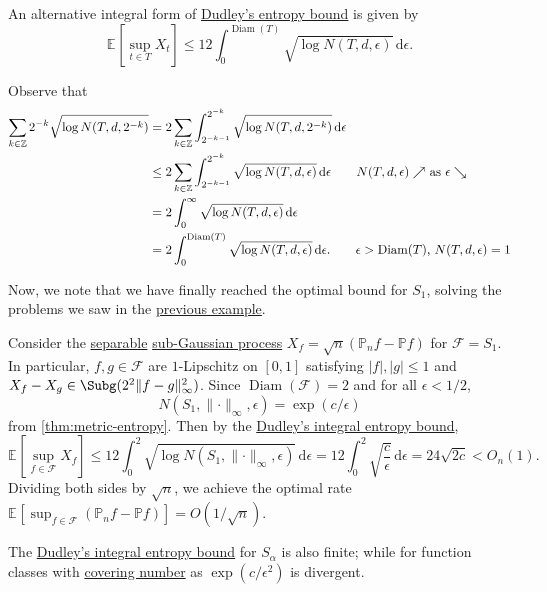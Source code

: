 \begin{remark}\label{rmk:Dudley-integral-entropy-bound}
	An alternative integral form of \hyperref[thm:Dudley-entropy-bound]{Dudley's entropy bound} is given by
	\[
		\mathbb{E}_{}\left[\sup _{t\in T} X_t \right] \leq 12 \int_{0}^{\mathop{\mathrm{Diam}}(T) }\sqrt{\log N(T, d, \epsilon )} \,\mathrm{d}\epsilon.
	\]
\end{remark}
\begin{explanation}
	Observe that
	\begin{align*}
		\sum_{k\in \mathbb{Z} } 2^{-k} \sqrt{\log N(T, d, 2^{-k})}
		 & = 2 \sum_{k\in \mathbb{Z} } \int_{2^{-k-1}}^{2^{-k}} \sqrt{\log N(T, d, 2^{-k})}  \,\mathrm{d} \epsilon                                                                        \\
		 & \leq 2 \sum_{k\in \mathbb{Z} } \int_{2^{-k-1}}^{2^{-k}} \sqrt{\log N(T, d, \epsilon )} \,\mathrm{d} \epsilon \tag*{\(N(T, d, \epsilon ) \nearrow \) as \(\epsilon \searrow \)} \\
		 & = 2 \int_{0}^{\infty} \sqrt{\log N(T, d, \epsilon )} \,\mathrm{d}\epsilon                                                                                                      \\
		 & = 2 \int_{0}^{\mathop{\mathrm{Diam}}(T) } \sqrt{\log N(T, d, \epsilon )} \,\mathrm{d}\epsilon. \tag*{\(\epsilon > \mathop{\mathrm{Diam}}(T) \), \(N(T, d, \epsilon ) = 1\)}
	\end{align*}
\end{explanation}

Now, we note that we have finally reached the optimal bound for \(S_1\), solving the problems we saw in the \hyperref[eg:non-optimal-empirical-process-supremum-S1]{previous example}. 

\begin{eg}
	Consider the \hyperref[def:separable]{separable} \hyperref[def:sub-Gaussian-process]{sub-Gaussian process} \(X_f = \sqrt{n} (\mathbb{P} _n f - \mathbb{P} f)\) for \(\mathscr{F} = S_1\). In particular, \(f, g\in \mathscr{F} \) are \(1\)-Lipschitz on \([0, 1]\) satisfying \(\vert f \vert , \vert g \vert \leq 1\) and \(X_f - X_g\in \Subg(2^2 \lVert f - g \rVert ^2_\infty )\). Since \(\mathop{\mathrm{Diam}}(\mathscr{F} ) = 2 \) and for all \(\epsilon < 1 / 2\),
	\[
		N(S_1, \lVert \cdot \rVert _\infty , \epsilon ) = \exp (c / \epsilon )
	\]
	from \autoref{thm:metric-entropy}. Then by the \hyperref[rmk:Dudley-integral-entropy-bound]{Dudley's integral entropy bound},
	\[
		\mathbb{E}_{}\left[\sup _{f\in \mathscr{F} } X_f \right]
		\leq 12\int_{0}^{2} \sqrt{\log N(S_1, \lVert \cdot \rVert _\infty , \epsilon )} \,\mathrm{d}\epsilon
		= 12 \int_{0}^{2} \sqrt{\frac{c}{\epsilon }} \,\mathrm{d}\epsilon 
		= 24 \sqrt{2c} 
		< O_n(1).
	\]
	Dividing both sides by \(\sqrt{n} \), we achieve the optimal rate \(\mathbb{E}_{}\left[\sup _{f\in \mathscr{F} } (\mathbb{P} _n f - \mathbb{P} f) \right] = O(1 / \sqrt{n} )\).
\end{eg}

\begin{remark}
	The \hyperref[rmk:Dudley-integral-entropy-bound]{Dudley's integral entropy bound} for \(S_\alpha \) is also finite; while for function classes with \hyperref[def:covering-number]{covering number} as \(\exp (c / \epsilon ^2)\) is divergent.
\end{remark}